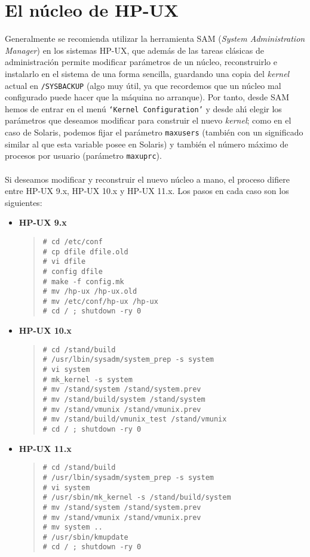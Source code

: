 \section{El n\'ucleo de HP-UX}
Generalmente se recomienda utilizar la herramienta SAM ({\it System 
Administration Manager}) en los sistemas HP-UX, que adem\'as de las tareas 
cl\'asicas de administraci\'on permite modificar par\'ametros de un n\'ucleo, 
reconstruirlo e instalarlo en el sistema de una forma sencilla, guardando una
copia del {\it kernel} actual en {\tt /SYSBACKUP} (algo muy \'util, ya que 
recordemos que un n\'ucleo mal configurado puede hacer que la m\'aquina no 
arranque). Por tanto, desde SAM hemos de entrar en el men\'u {\tt `Kernel 
Configuration'} y desde ah\'{\i} elegir los par\'ametros que deseamos modificar
para construir el nuevo {\it kernel}; como en el caso de Solaris, podemos fijar 
el par\'ametro {\tt maxusers} (tambi\'en con un significado similar al que esta 
variable posee en Solaris) y tambi\'en el n\'umero m\'aximo de procesos por 
usuario (par\'ametro {\tt maxuprc}).\\
\\Si deseamos modificar y reconstruir el nuevo n\'ucleo a mano, el proceso 
difiere entre HP-UX 9.x, HP-UX 10.x y HP-UX 11.x. Los pasos en cada caso son 
los siguientes:
\begin{itemize}
\item {\bf HP-UX 9.x}
\begin{quote}
\begin{verbatim}
# cd /etc/conf
# cp dfile dfile.old
# vi dfile
# config dfile
# make -f config.mk
# mv /hp-ux /hp-ux.old
# mv /etc/conf/hp-ux /hp-ux
# cd / ; shutdown -ry 0
\end{verbatim}
\end{quote}
\item {\bf HP-UX 10.x}
\begin{quote}
\begin{verbatim}
# cd /stand/build
# /usr/lbin/sysadm/system_prep -s system
# vi system
# mk_kernel -s system
# mv /stand/system /stand/system.prev
# mv /stand/build/system /stand/system
# mv /stand/vmunix /stand/vmunix.prev
# mv /stand/build/vmunix_test /stand/vmunix
# cd / ; shutdown -ry 0
\end{verbatim}
\end{quote}
\item {\bf HP-UX 11.x}
\begin{quote}
\begin{verbatim}
# cd /stand/build 
# /usr/lbin/sysadm/system_prep -s system 
# vi system 
# /usr/sbin/mk_kernel -s /stand/build/system 
# mv /stand/system /stand/system.prev 
# mv /stand/vmunix /stand/vmunix.prev 
# mv system .. 
# /usr/sbin/kmupdate 
# cd / ; shutdown -ry 0
\end{verbatim}
\end{quote}
\end{itemize}
